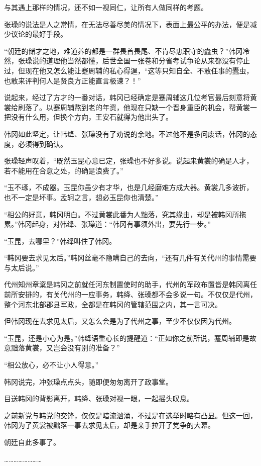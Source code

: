 与其遇上那样的情况，还不如一视同仁，让所有人做同样的考题。

张璪的说法是人之常情，在无法尽善尽美的情况下，表面上最公平的办法，便是减少议论的最好手段。

“朝廷的储才之地，难道养的都是一群畏首畏尾、不肯尽忠职守的蠹虫？”韩冈冷然，张璪说的道理他当然都懂，后世全国一张卷和分省考试争论从来都没有停止过，但现在他又怎么能让蹇周辅的私心得逞，“这等只知自全、不敢任事的蠹虫，也敢来评判何人是贤良方正能直言极谏？！”

说起来，经过了方才的一番对话，韩冈已经确定是蹇周辅这几位考官最后刻意将黄裳给刷落了。以蹇周辅熬到老的年资，他现在只缺一个晋身重臣的机会，帮黄裳一把没有什么用，但换个方向，王安石就得为他出头了。

韩冈如此坚定，让韩绛、张璪没有了劝说的余地。不过他不是多问废话，韩冈的态度，必须得到确认。

张璪轻声叹着，“既然玉昆心意已定，张璪也不好多说。说起来黄裳的确是人才，若不能用在合意之处，的确是浪费了。”

“玉不琢，不成器。玉昆你虽少有才华，也是几经磨难方成大器。黄裳几多波折，也不一定是坏事。孟轲之言，想必玉昆你也清楚。”

“相公的好意，韩冈明白。不过黄裳此番为人黜落，究其缘由，却是被韩冈所拖累。”韩冈起身，对韩绛、张璪道：“韩冈有事须外出，要先行一步。”

“玉昆，去哪里？”韩绛叫住了韩冈。

“韩冈要去求见太后。”韩冈丝毫不隐瞒自己的去向，“还有几件有关代州的事情需要与太后说。”

代州知州章楶是韩冈之前就任河东制置使时的助手，代州的军政布置皆是韩冈离任前所安排的，有关代州的一应事务，韩绛、张璪都不会多说一句。不仅仅是代州，整个河东北部郡县军政，全都是在韩冈的管辖范围之内，其一言可决。

但韩冈现在去求见太后，又怎么会是为了代州之事，至少不仅仅因为代州。

“玉昆，还是小心为是。”韩绛语重心长的提醒道：“正如你之前所说，蹇周辅即是故意黜落黄裳，又岂会没有别的准备？”

“相公放心，必不让小人得意。”

韩冈说完，冲张璪点点头，随即便匆匆离开了政事堂。

目送韩冈的背影离开，韩绛、张璪对视一眼，一起摇头叹息。

之前新党与韩党的交锋，仅仅是暗流汹涌，不过是在选举时略有凸显。但这一回，韩冈为了黄裳被黜落一事去求见太后，却是亲手拉开了党争的大幕。

朝廷自此多事了。

……………………

